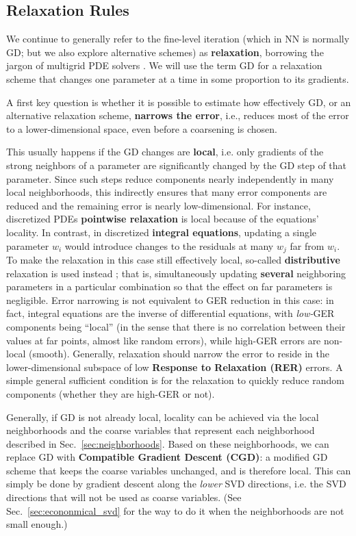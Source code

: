 \documentclass{article} %
\begin{document}
\subsection{Relaxation Rules}
\label{sec:relaxation_rules}
We continue to generally refer to the fine-level iteration (which in NN is normally GD; but we also explore alternative schemes) as \textbf{relaxation}, borrowing the jargon of multigrid PDE solvers \cite[Sec.~1]{guide}. We will use the term GD for a relaxation scheme that changes one parameter at a time in some proportion to its gradients. 

A first key question is whether it is possible to estimate how effectively GD, or an alternative relaxation scheme, \textbf{narrows the error}, i.e., reduces most of the error to a lower-dimensional space, even before a coarsening is chosen. 

This usually happens if the GD changes are \textbf{local}, i.e. only gradients of the strong neighbors of a parameter are significantly changed by the GD step of that parameter. Since such steps reduce components nearly independently in many local neighborhoods, this indirectly ensures that many error components are reduced and the remaining error is nearly low-dimensional. For instance, discretized PDEs \textbf{pointwise relaxation} \cite[Sec.~1]{guide} is local because of the equations' locality. In contrast, in discretized \textbf{integral equations}, updating a single parameter $w_i$ would introduce changes to the residuals at many $w_j$ far from $w_i$. To make the relaxation in this case still effectively local, so-called \textbf{distributive} relaxation is used instead \cite{lubrecht}; that is, simultaneously updating \textbf{several} neighboring parameters in a particular combination so that the effect on far parameters is negligible. Error narrowing is not equivalent to GER reduction in this case: in fact, integral equations are the inverse of differential equations, with {\it low-}GER components being ``local'' (in the sense that there is no correlation between their values at far points, almost like random errors), while high-GER errors are non-local (smooth). Generally, relaxation should narrow the error to reside in the lower-dimensional subspace of low \textbf{Response to Relaxation (RER)} errors. A simple general sufficient condition is for the relaxation to quickly reduce random components (whether they are high-GER or not).

Generally, if GD is not already local, locality can be achieved via the local neighborhoods and the coarse variables that represent each neighborhood described in Sec.~\ref{sec:neighborhoods}. Based on these neighborhoods, we can replace GD with \textbf{Compatible Gradient Descent (CGD)}: a modified GD scheme that keeps the coarse variables unchanged, and is therefore local. This can simply be done by gradient descent along the {\it lower} SVD directions, i.e. the SVD directions that will not be used as coarse variables. (See Sec.~\ref{sec:econonmical_svd} for the way to do it when the neighborhoods are not small enough.)
\end{document}
